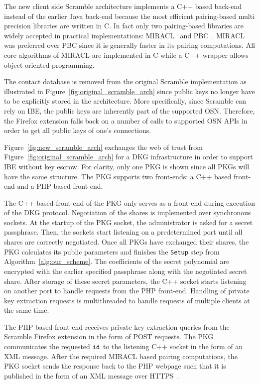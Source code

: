 The new client side Scramble architecture implements a C++ based back-end instead of the earlier Java back-end because the most efficient pairing-based multi precision libraries are written in C. In fact only two pairing-based libraries are widely accepted in practical implementations: MIRACL~\cite{art:Scott03} and PBC~\cite{thesis:Lynn07}. MIRACL was preferred over PBC since it is generally faster in its pairing computations. All core algorithms of MIRACL are implemented in C while a C++ wrapper allows object-oriented programming.

The contact database is removed from the original Scramble implementation as illustrated in Figure~\ref{fig:original_scramble_arch} since public keys no longer have to be explicitly stored in the architecture. More specifically, since Scramble can rely on IBE, the public keys are inherently part of the supported OSN. Therefore, the Firefox extension falls back on a number of calls to supported OSN APIs in order to get all public keys of one's connections.

Figure~\ref{fig:new_scramble_arch} exchanges the web of trust from Figure~\ref{fig:original_scramble_arch} for a DKG infrastructure in order to support IBE without key escrow. For clarity, only one PKG is shown since all PKGs will have the same structure. The PKG supports two front-ends: a C++ based front-end and a PHP based front-end. 

The C++ based front-end of the PKG only serves as a front-end during execution of the DKG protocol. Negotiation of the shares is implemented over synchronous sockets. At the startup of the PKG socket, the administrator is asked for a secret passphrase. Then, the sockets start listening on a predetermined port until all shares are correctly negotiated. Once all PKGs have exchanged their shares, the PKG calculates its public parameters and finishes the \texttt{Setup} step from Algorithm~\ref{alg:our_scheme}. The coefficients of the secret polynomial are encrypted with the earlier specified passphrase along with the negotiated secret share. After storage of these secret parameters, the C++ socket starts listening on another port to handle requests from the PHP front-end. Handling of private key extraction requests is multithreaded to handle requests of multiple clients at the same time.

The PHP based front-end receives private key extraction queries from the Scramble Firefox extension in the form of POST requests. The PKG communicates the requested $\mathtt{id}_{}$ to the listening C++ socket in the form of an XML message. After the required MIRACL based pairing computations, the PKG socket sends the response back to the PHP webpage such that it is published in the form of an XML message over HTTPS~\cite{rfc2818}.

